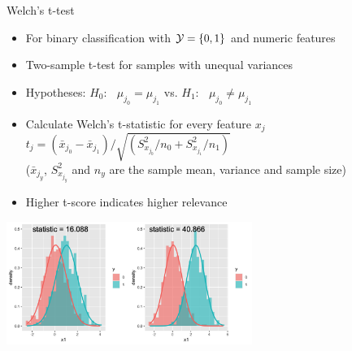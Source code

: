 \documentclass[11pt,compress,t,notes=noshow, xcolor=table]{beamer}
\begin{document}



  \begin{frame2}{Welch's \MakeLowercase{t}-test}
  \begin{itemize}
  \setlength{\itemsep}{0.6em}
    \item For binary classification with $\mathcal{Y} = \{ 0, 1\}$ and numeric features
    \item Two-sample t-test for samples with unequal variances
   \item Hypotheses:
    $H_0$: $\;\;\mu_{j_0} = \mu_{j_1} $ \qquad vs. \qquad $H_1$: $\;\;\mu_{j_0} \neq \mu_{j_1}$

    \item Calculate Welch's t-statistic for every feature $x_j$
    $ t_j = (\bar{x}_{j_0} - \bar{x}_{j_1})/ \sqrt{(S^2_{x_{j_0}}/n_0 + S^2_{x_{j_1}}/n_1)}$\\
    ($\bar{x}_{j_y}$, $S^2_{x_{j_{y}}}$ and $n_y$ are the sample mean, %
    variance and sample size)
    \item Higher t-score indicates higher relevance
  \end{itemize}
\vspace{-0.01cm}
  \begin{center}
\includegraphics[width=0.6\textwidth, height=0.29\textheight]{figure/fs-t-test.png}
  \end{center}
  
  \end{frame2}
\end{document}
